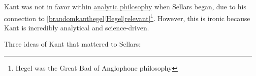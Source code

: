 Kant was not in favor within \href{https://en.wikipedia.org/wiki/Analytic_philosophy}{analytic philosophy} when Sellars began, due to his connection to \ref{brandomkanthegel|Hegel|relevant}\footnote{Hegel was the Great Bad of Anglophone philosophy}. However, this is ironic because Kant is incredibly analytical and science-driven.

Three ideas of Kant that mattered to Sellars:

